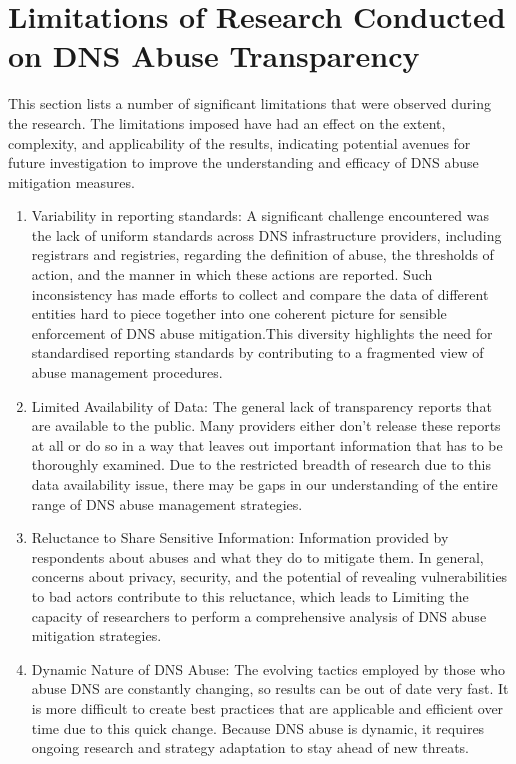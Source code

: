 \section{Limitations of Research Conducted on DNS Abuse Transparency }

This section lists a number of significant limitations that were observed during the research. The limitations imposed have had an effect on the extent, complexity, and applicability of the results, indicating potential avenues for future investigation to improve the understanding and efficacy of DNS abuse mitigation measures.

\begin{enumerate}
    \item Variability in reporting standards: A significant challenge encountered was the lack of uniform standards across DNS infrastructure providers, including registrars and registries, regarding the definition of abuse, the thresholds of action, and the manner in which these actions are reported. Such inconsistency has made efforts to collect and compare the data of different entities hard to piece together into one coherent picture for sensible enforcement of DNS abuse mitigation.This diversity highlights the need for standardised reporting standards by contributing to a fragmented view of abuse management procedures.

    \item Limited Availability of Data: The general lack of transparency reports that are available to the public. Many providers either don't release these reports at all or do so in a way that leaves out important information that has to be thoroughly examined. Due to the restricted breadth of research due to this data availability issue, there may be gaps in our understanding of the entire range of DNS abuse management strategies.
\vspace{30px}
    \item Reluctance to Share Sensitive Information: Information provided by respondents about abuses and what they do to mitigate them. In general, concerns about privacy, security, and the potential of revealing vulnerabilities to bad actors contribute to this reluctance, which leads to Limiting the capacity of researchers to perform a comprehensive analysis of DNS abuse mitigation strategies.
    
    \item Dynamic Nature of DNS Abuse: The evolving tactics employed by those who abuse DNS are constantly changing, so results can be out of date very fast. It is more difficult to create best practices that are applicable and efficient over time due to this quick change. Because DNS abuse is dynamic, it requires ongoing research and strategy adaptation to stay ahead of new threats.


\end{enumerate}
